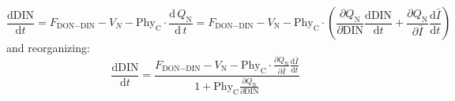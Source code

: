 \documentclass[gmd, manuscript, draft]{copernicus}
\newcommand{\onur}[1]{\textcolor{blue}{\{Onur: #1\}}}
\begin{document}
\begin{equation}\label{eq:sdin2}
  \frac{\text{d}\text{DIN}}{\text{d}t} = F_{\text{DON}-\text{DIN}} - V_N - \text{Phy}_{\text{C}} \cdot \frac{\mathrm{d}\, Q_{\text{N}}}{\mathrm{d}\, t}
  = F_{\text{DON}-\text{DIN}} - V_{\text{N}} - \text{Phy}_{\text{C}} \cdot \left(\frac{\partial Q_{\text{N}}}{\partial \text{DIN}} \frac{\text{d} \text{DIN}}{\text{d} t}
    + \frac{\partial Q_{\text{N}}}{\partial \bar{I}} \frac{\text{d} \bar{I}}{\text{d} t} \right)
\end{equation}
and reorganizing:
\begin{equation}\label{eq:sdin3}
  \frac{\text{d}\text{DIN}}{\text{d}t} = \frac{\displaystyle F_{\text{DON}-\text{DIN}} - V_{\text{N}} - \text{Phy}_{\text{C}} \cdot \frac{\partial Q_{\text{N}}}{\partial \bar{I}} \frac{\text{d} \bar{I}}{\text{d} t}}{\displaystyle 1+ \text{Phy}_{\text{C}}\frac{\partial Q_{\text{N}}}{\partial \text{DIN}}}
\end{equation}


\end{document}

